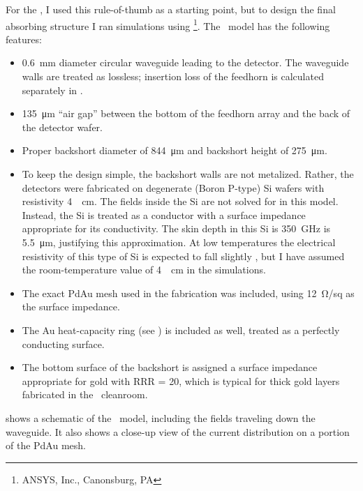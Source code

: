 For the \Imager, I used this rule-of-thumb as a starting point, but to design the final absorbing structure I ran simulations using \HFSS\footnote{ANSYS, Inc., Canonsburg, PA}.
The \HFSS\ model has the following features:
\begin{itemize}
\item \SI{0.6}{\mm} diameter circular waveguide leading to the detector.
      The waveguide walls are treated as lossless; insertion loss of the feedhorn is calculated separately in . 
\item \SI{135}{\um} ``air gap'' between the bottom of the feedhorn array and the back of the detector wafer.
\item Proper backshort diameter of \SI{844}{\um} and backshort height of \SI{275}{\um}.
\item To keep the design simple, the backshort walls are not metalized.
      Rather, the detectors were fabricated on degenerate (Boron P-type) Si wafers with resistivity \SI{4}{\mOhm\cm}.
      The fields inside the Si are not solved for in this model.
      Instead, the Si is treated as a conductor with a surface impedance appropriate for its conductivity.
      The skin depth in this Si is \SI{350}{\GHz} is \SI{5.5}{\um}, justifying this approximation.
      At low temperatures the electrical resistivity of this type of Si is expected to fall slightly \cite{chapman_electrical_1963}, but I have assumed the room-temperature value of \SI{4}{\mOhm\cm} in the simulations.
\item The exact PdAu mesh used in the fabrication was included, using \SI{12}{\ohm}/sq as the surface impedance.
\item The Au heat-capacity ring (see ) is included as well, treated as a perfectly conducting surface.
\item The bottom surface of the backshort is assigned a surface impedance appropriate for gold with RRR = 20, which is typical for thick gold layers fabricated in the \NIST\ cleanroom.
\end{itemize}
 shows a schematic of the \HFSS\ model, including the fields traveling down the waveguide.
It also shows a close-up view of the current distribution on a portion of the PdAu mesh.

